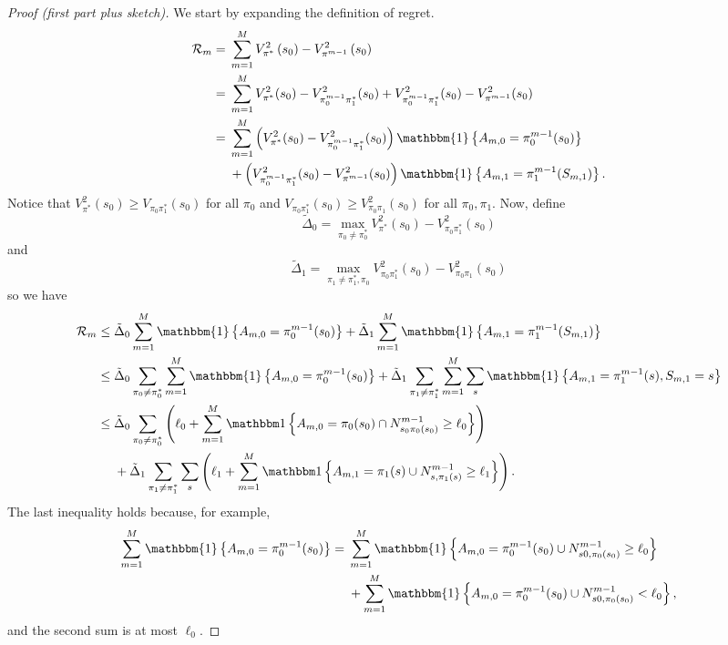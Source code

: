 \documentclass[11pt]{article}
\begin{document}
\begin{proof}[Proof (first part plus sketch)] 
	We start by expanding the definition of regret.
	\begin{align*}
		\regret_{m} ={}& \sum_{m=1}^{M} V_{\pi^*}^{2}\left(s_{0}\right) - V_{\pi^{m-1}}^{2}\left(s_{0}\right) \\
		={}& \sum_{m=1}^{M} V_{\pi^*}^{2}(s_{0}) - V_{\pi_{0}^{m-1}\pi_{1}^{*}}^{2}(s_{0}) + V_{\pi_{0}^{m-1}\pi_{1}^{*}}^{2}(s_{0}) - V_{\pi^{m-1}}^{2}(s_{0}) \\
		={}& \sum_{m=1}^{M} \left(V_{\pi^*}^{2}(s_{0}) - V_{\pi_{0}^{m-1}\pi_{1}^{*}}^{2}(s_{0})\right) \mathbbm{1}\left\{A_{m,0} = \pi_{0}^{m-1}(s_{0})\right\} \\
		&{}+ \left(V_{\pi_{0}^{m-1}\pi_{1}^{*}}^{2}(s_{0}) - V_{\pi^{m-1}}^{2}(s_{0})\right) \mathbbm{1}\left\{A_{m,1} = \pi_{1}^{m-1}(S_{m,1})\right\}.
	\end{align*}
	Notice that $V_{\pi^*}^{2}(s_{0}) \geq V_{\pi_{0}\pi_{1}^{*}}(s_{0})$ for all $\pi_{0}$ and $V_{\pi_0\pi_{1}^{*}}(s_{0}) \geq V_{\pi_{0}\pi_{1}}^{2}(s_{0})$ for all $\pi_{0}, \pi_{1}$. Now, define 
	\[
		\tilde{\Delta}_{0} = \max_{\pi_{0}\neq \pi_{0}^{*}} V_{\pi^*}^{2}(s_{0}) - V_{\pi_0\pi_1^*}^{2}(s_{0})
	\]
	and 
	\[
		\tilde{\Delta}_{1} = \max_{\pi_{1} \neq \pi_{1}^{*}, \pi_{0}} V_{\pi_{0}\pi_{1}^{*}}^{2}(s_{0}) - V_{\pi_{0}\pi_{1}}^{2}(s_{0})
	\]
	so we have
	\begin{align*}
		\regret_{m} \leq{}& \tilde{\Delta}_{0} \sum_{m=1}^{M} \mathbbm{1}\left\{A_{m,0} = \pi_{0}^{m-1}(s_{0})\right\} + \tilde{\Delta}_{1} \sum_{m=1}^{M} \mathbbm{1}\left\{A_{m,1} = \pi_{1}^{m-1}(S_{m,1})\right\} \\
		\leq{}& \tilde{\Delta}_{0} \sum_{\pi_{0}\neq \pi_{0}^{*}}\sum_{m=1}^{M} \mathbbm{1}\left\{A_{m,0} = \pi_{0}^{m-1}(s_{0})\right\} + \tilde{\Delta}_{1} \sum_{\pi_{1}\neq\pi_{1}^{*}} \sum_{m=1}^{M} \sum_{s} \mathbbm{1}\left\{A_{m,1} = \pi_{1}^{m-1}(s), S_{m,1} = s\right\} \\
		\leq{}& \tilde{\Delta}_{0} \sum_{\pi_{0}\neq\pi_{0}^*} \left(\ell_{0} + \sum_{m=1}^{M} \ind\left\{A_{m,0} = \pi_{0}(s_{0}) \cap N_{s_{0}\pi_{0}(s_{0})}^{m-1} \geq \ell_{0}\right\}\right) \\
		&{}+ \tilde{\Delta}_{1} \sum_{\pi_{1} \neq \pi_{1}^{*}} \sum_{s} \left(\ell_{1} + \sum_{m=1}^{M} \ind\left\{A_{m,1} = \pi_{1}(s) \cup N_{s, \pi_{1}(s)}^{m-1} \geq \ell_{1}\right\}\right).
	\end{align*}
	The last inequality holds because, for example,
	\begin{align*}
		\sum_{m=1}^{M} \mathbbm{1}\left\{A_{m,0} = \pi_{0}^{m-1}(s_{0})\right\} ={}& \sum_{m=1}^{M} \mathbbm{1}\left\{A_{m,0} = \pi_{0}^{m-1}(s_{0}) \cup N_{s{0},\pi_{0}(s_{0})}^{m-1} \geq \ell_{0}\right\} \\
		&{}+ \sum_{m=1}^{M} \mathbbm{1}\left\{A_{m,0} = \pi_{0}^{m-1}(s_{0}) \cup N_{s{0},\pi_{0}(s_{0})}^{m-1} < \ell_{0}\right\},
	\end{align*}
	and the second sum is at most $\ell_{0}$. 
	

\end{proof}
\end{document}
